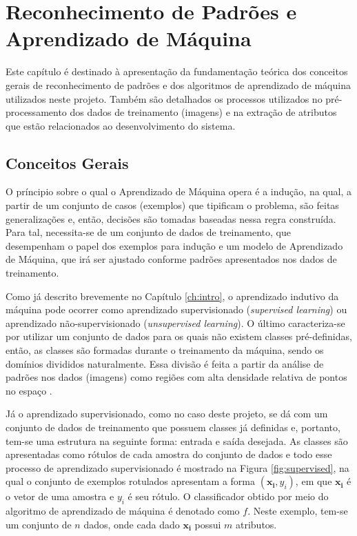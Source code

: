 \chapter{Reconhecimento de Padrões e Aprendizado de Máquina}
\label{ch:ML}

Este capítulo é destinado à apresentação da fundamentação teórica dos conceitos gerais de reconhecimento de padrões e dos algoritmos de aprendizado de máquina utilizados neste projeto. Também são detalhados os processos utilizados no pré-processamento dos dados de treinamento (imagens) e na extração de atributos que estão relacionados ao desenvolvimento do sistema.


\section{Conceitos Gerais}

O príncipio sobre o qual o Aprendizado de Máquina opera é a indução, na qual, a partir de um conjunto de casos (exemplos) que tipificam o problema, são feitas generalizações e, então, decisões são tomadas baseadas nessa regra construída. Para tal, necessita-se de um conjunto de dados de treinamento, que desempenham o papel dos exemplos para indução e um modelo de Aprendizado de Máquina, que irá ser ajustado conforme padrões apresentados nos dados de treinamento.

Como já descrito brevemente no Capítulo \ref{ch:intro}, o aprendizado indutivo da máquina pode ocorrer como aprendizado supervisionado (\textit{supervised learning}) ou aprendizado não-supervisionado (\textit{unsupervised learning}). O último caracteriza-se por utilizar um conjunto de dados para os quais não existem classes pré-definidas, então, as classes são formadas durante o treinamento da máquina, sendo os domínios divididos naturalmente. Essa divisão é feita a partir da análise de padrões nos dados (imagens) como regiões com alta densidade relativa de pontos no espaço .

Já o aprendizado supervisionado, como no caso deste projeto, se dá com um conjunto de dados de treinamento que possuem classes já definidas e, portanto, tem-se uma estrutura na seguinte forma: entrada e saída desejada. As classes são apresentadas como rótulos de cada amostra do conjunto de dados e todo esse processo de aprendizado supervisionado é mostrado na Figura \ref{fig:supervised}, na qual o conjunto de exemplos rotulados apresentam a forma $(\boldsymbol{x_i}, y_i)$, em que $\boldsymbol{x_i}$ é o vetor de uma amostra e $y_i$ é seu rótulo. O classificador obtido por meio do algoritmo de aprendizado de máquina é denotado como $f$. Neste exemplo, tem-se um conjunto de $n$ dados, onde cada dado $\boldsymbol{x_i}$ possui $m$ atributos.


